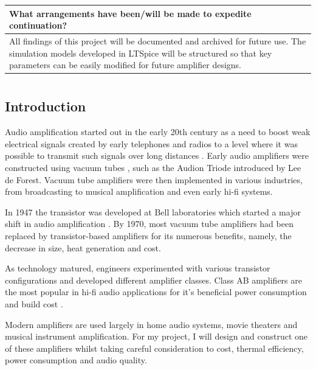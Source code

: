 \documentclass[12pt,a4paper]{report}
\newcommand{\mainmatterpages}{
	\clearpage
	\pagenumbering{arabic}
}
\begin{document}
\begin{center}
\begin{tabular}{|p{}|}
			\centering\textbf{What arrangements have been/will be made to expedite continuation?}\tabularnewline
			\hline
			All findings of this project will be documented and archived for future use. The simulation models developed in LTSpice will be structured so that key parameters can be easily modified for future amplifier designs. 
			\tabularnewline
			\hline
		\end{tabular}
	\end{center}
	
	\mainmatterpages
	
	\chapter*{}
	\vspace{-9em}
	\section{Introduction}
	
	Audio amplification started out in the early 20th century as a need to boost weak electrical signals created by early telephones and radios to a level where it was possible to transmit such signals over long distances \cite{horowitz_hill}. Early audio amplifiers were constructed using vacuum tubes \cite{self_audio_amplifier_design}, such as the Audion Triode introduced by Lee de Forest. Vacuum tube amplifiers were then implemented in various industries, from broadcasting to musical amplification and even early hi-fi systems.
	
	In 1947 the transistor was developed at Bell laboratories which started a major shift in audio amplification \cite{bardeen_transistor}. By 1970, most vacuum tube amplifiers had been replaced by transistor-based amplifiers for its numerous benefits, namely, the decrease in size, heat generation and cost.
	
	As technology matured, engineers experimented with various transistor configurations and developed different amplifier classes. Class AB amplifiers are the most popular in hi-fi audio applications for it's beneficial power consumption and build cost \cite{self_audio_amplifier_design}.
	
	Modern amplifiers are used largely in home audio systems, movie theaters and musical instrument amplification. For my project, I will design and construct one of these amplifiers whilst taking careful consideration to cost, thermal efficiency, power consumption and audio quality.
	
\end{document}
